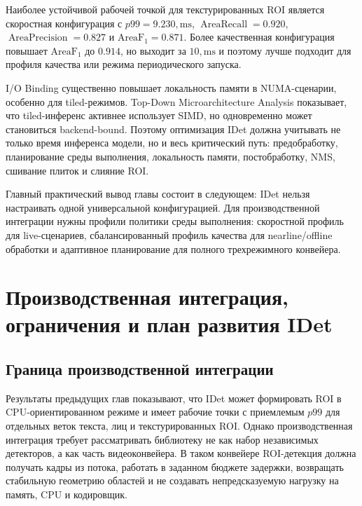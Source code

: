 \documentclass[12pt,a4paper,oneside,openany]{report}
\newcommand{\ms}{\mathrm{ms}}
\begin{document}
Наиболее устойчивой рабочей точкой для текстурированных ROI является скоростная конфигурация с $p99=9.230,\ms$, $\operatorname{AreaRecall}=0.920$, $\operatorname{AreaPrecision}=0.827$ и $\operatorname{AreaF_1}=0.871$. Более качественная конфигурация повышает $\operatorname{AreaF_1}$ до $0.914$, но выходит за $10,\ms$ и поэтому лучше подходит для профиля качества или режима периодического запуска.

I/O Binding существенно повышает локальность памяти в NUMA-сценарии, особенно для tiled-режимов. Top-Down Microarchitecture Analysis показывает, что tiled-инференс активнее использует SIMD, но одновременно может становиться backend-bound. Поэтому оптимизация IDet должна учитывать не только время инференса модели, но и весь критический путь: предобработку, планирование среды выполнения, локальность памяти, постобработку, NMS, сшивание плиток и слияние ROI.

Главный практический вывод главы состоит в следующем: IDet нельзя настраивать одной универсальной конфигурацией. Для производственной интеграции нужны профили политики среды выполнения: скоростной профиль для live-сценариев, сбалансированный профиль качества для nearline/offline обработки и адаптивное планирование для полного трехрежимного конвейера.


\chapter{Производственная интеграция, ограничения и план развития IDet}


\section{Граница производственной интеграции}

Результаты предыдущих глав показывают, что IDet может формировать ROI в CPU-ориентированном режиме и имеет рабочие точки с приемлемым $p99$ для отдельных веток текста, лиц и текстурированных ROI. Однако производственная интеграция требует рассматривать библиотеку не как набор независимых детекторов, а как часть видеоконвейера. В таком конвейере ROI-детекция должна получать кадры из потока, работать в заданном бюджете задержки, возвращать стабильную геометрию областей и не создавать непредсказуемую нагрузку на память, CPU и кодировщик.
\end{document}

